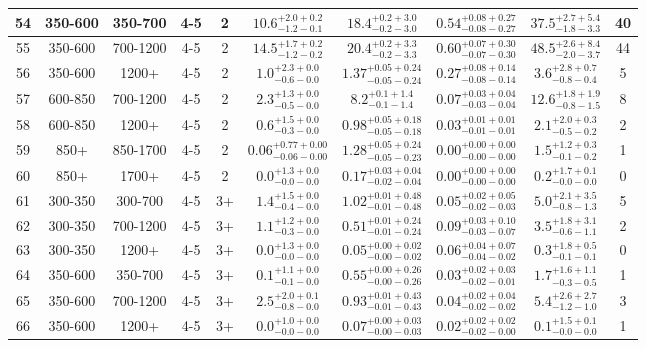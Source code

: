\documentclass[11pt, oneside]{article}
\begin{document}
\begin{table}
{\begin{tabular}{ |c|c|c|c|c||c|c|c||c|c| }
54 & 350-600 & 350-700 & 4-5 & 2 & $10.6^{+2.0+0.2}_{-1.2-0.1}$ & $18.4^{+0.2+3.0}_{-0.2-3.0}$ & $0.54^{+0.08+0.27}_{-0.08-0.27}$ & $37.5^{+2.7+5.4}_{-1.8-3.3}$ & 40 \\ \hline
55 & 350-600 & 700-1200 & 4-5 & 2 & $14.5^{+1.7+0.2}_{-1.2-0.2}$ & $20.4^{+0.2+3.3}_{-0.2-3.3}$ & $0.60^{+0.07+0.30}_{-0.07-0.30}$ & $48.5^{+2.6+8.4}_{-2.0-3.7}$ & 44 \\ \hline
56 & 350-600 & 1200+ & 4-5 & 2 & $1.0^{+2.3+0.0}_{-0.6-0.0}$ & $1.37^{+0.05+0.24}_{-0.05-0.24}$ & $0.27^{+0.08+0.14}_{-0.08-0.14}$ & $3.6^{+2.8+0.7}_{-0.8-0.4}$ & 5 \\ \hline
57 & 600-850 & 700-1200 & 4-5 & 2 & $2.3^{+1.3+0.0}_{-0.5-0.0}$ & $8.2^{+0.1+1.4}_{-0.1-1.4}$ & $0.07^{+0.03+0.04}_{-0.03-0.04}$ & $12.6^{+1.8+1.9}_{-0.8-1.5}$ & 8 \\ \hline
58 & 600-850 & 1200+ & 4-5 & 2 & $0.6^{+1.5+0.0}_{-0.3-0.0}$ & $0.98^{+0.05+0.18}_{-0.05-0.18}$ & $0.03^{+0.01+0.01}_{-0.01-0.01}$ & $2.1^{+2.0+0.3}_{-0.5-0.2}$ & 2 \\ \hline
59 & 850+ & 850-1700 & 4-5 & 2 & $0.06^{+0.77+0.00}_{-0.06-0.00}$ & $1.28^{+0.05+0.24}_{-0.05-0.23}$ & $0.00^{+0.00+0.00}_{-0.00-0.00}$ & $1.5^{+1.2+0.3}_{-0.1-0.2}$ & 1 \\ \hline
60 & 850+ & 1700+ & 4-5 & 2 & $0.0^{+1.3+0.0}_{-0.0-0.0}$ & $0.17^{+0.03+0.04}_{-0.02-0.04}$ & $0.00^{+0.00+0.00}_{-0.00-0.00}$ & $0.2^{+1.7+0.1}_{-0.0-0.0}$ & 0 \\ \hline
61 & 300-350 & 300-700 & 4-5 & 3+ & $1.4^{+1.5+0.0}_{-0.4-0.0}$ & $1.02^{+0.01+0.48}_{-0.01-0.48}$ & $0.05^{+0.02+0.05}_{-0.02-0.03}$ & $5.0^{+2.1+3.5}_{-0.8-1.3}$ & 5 \\ \hline
62 & 300-350 & 700-1200 & 4-5 & 3+ & $1.1^{+1.2+0.0}_{-0.3-0.0}$ & $0.51^{+0.01+0.24}_{-0.01-0.24}$ & $0.09^{+0.03+0.10}_{-0.03-0.07}$ & $3.5^{+1.8+3.1}_{-0.6-1.1}$ & 2 \\ \hline
63 & 300-350 & 1200+ & 4-5 & 3+ & $0.0^{+1.3+0.0}_{-0.0-0.0}$ & $0.05^{+0.00+0.02}_{-0.00-0.02}$ & $0.06^{+0.04+0.07}_{-0.04-0.02}$ & $0.3^{+1.8+0.5}_{-0.1-0.1}$ & 0 \\ \hline
64 & 350-600 & 350-700 & 4-5 & 3+ & $0.1^{+1.1+0.0}_{-0.1-0.0}$ & $0.55^{+0.00+0.26}_{-0.00-0.26}$ & $0.03^{+0.02+0.03}_{-0.02-0.01}$ & $1.7^{+1.6+1.1}_{-0.3-0.5}$ & 1 \\ \hline
65 & 350-600 & 700-1200 & 4-5 & 3+ & $2.5^{+2.0+0.1}_{-0.8-0.0}$ & $0.93^{+0.01+0.43}_{-0.01-0.43}$ & $0.04^{+0.02+0.04}_{-0.02-0.02}$ & $5.4^{+2.6+2.7}_{-1.2-1.0}$ & 3 \\ \hline
66 & 350-600 & 1200+ & 4-5 & 3+ & $0.0^{+1.0+0.0}_{-0.0-0.0}$ & $0.07^{+0.00+0.03}_{-0.00-0.03}$ & $0.02^{+0.02+0.02}_{-0.02-0.00}$ & $0.1^{+1.5+0.1}_{-0.0-0.0}$ & 1 \\ \hline

\end{tabular}}
\end{table}
\end{document}
